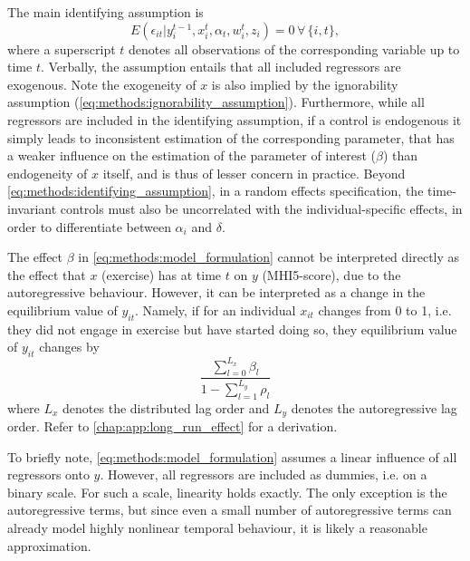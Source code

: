 The main identifying assumption is \cite{moral2019dynamic}
\begin{equation}
    \label{eq:methods:identifying_assumption}
    E(\epsilon_{it} | y_i^{t-1}, x_i^t, \alpha_t, w_{i}^t, z_i) = 0 \,\forall\,\{i,t\},
\end{equation}
where a superscript $t$ denotes all observations of the corresponding variable up to time $t$.
Verbally, the assumption entails that all included regressors are exogenous.
Note the exogeneity of $x$ is also implied by the ignorability assumption (\cref{eq:methods:ignorability_assumption}).
Furthermore, while all regressors are included in the identifying assumption, if a control is endogenous it simply
leads to inconsistent estimation of the corresponding parameter, that has a weaker influence on the estimation
of the parameter of interest ($\beta$) than endogeneity of $x$ itself, and is thus of lesser concern in practice.
Beyond \cref{eq:methods:identifying_assumption}, in a random effects specification, the time-invariant controls
must also be uncorrelated with the individual-specific effects, in order to differentiate between $\alpha_i$ and $\delta$.

The effect $\beta$ in \cref{eq:methods:model_formulation} cannot be interpreted directly as the effect that $x$ (exercise)
has at time $t$ on $y$ (MHI5-score), due to the autoregressive behaviour. However, it can be interpreted as a change
in the equilibrium value of $y_{it}$. Namely, if for an individual $x_{it}$ changes from 0 to 1, i.e. they did not
engage in exercise but have started doing so, they equilibrium value of $y_{it}$ changes by
\begin{equation}
    \frac{\sum_{l=0}^{L_x} \beta_l}{1 - \sum_{l=1}^{L_y} \rho_l}
\end{equation}
where $L_x$ denotes the distributed lag order and $L_y$ denotes the autoregressive lag order.
Refer to \cref{chap:app:long_run_effect} for a derivation.

To briefly note, \cref{eq:methods:model_formulation} assumes a linear influence of all regressors onto $y$. However, all regressors
are included as dummies, i.e. on a binary scale. For such a scale, linearity holds exactly.
The only exception is the autoregressive terms, but since even a small number of autoregressive terms can already
model highly nonlinear temporal behaviour, it is likely a reasonable approximation.

